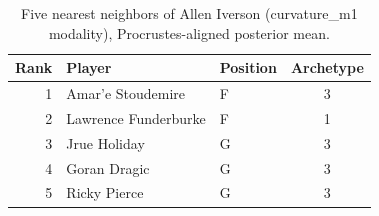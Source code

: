 \begin{table}[htbp]
  \centering\small
  \begin{tabular}{rllc}
    \toprule
    Rank & Player & Position & Archetype \\
    \midrule
    1 & Amar'e Stoudemire & F & 3 \\
    2 & Lawrence Funderburke & F & 1 \\
    3 & Jrue Holiday & G & 3 \\
    4 & Goran Dragic & G & 3 \\
    5 & Ricky Pierce & G & 3 \\
    \bottomrule
  \end{tabular}
  \caption{Five nearest neighbors of Allen Iverson (curvature_m1 modality), Procrustes-aligned posterior mean.}
  \label{tab:Allen_Iverson_neighbors_curvature_m1}
\end{table}

